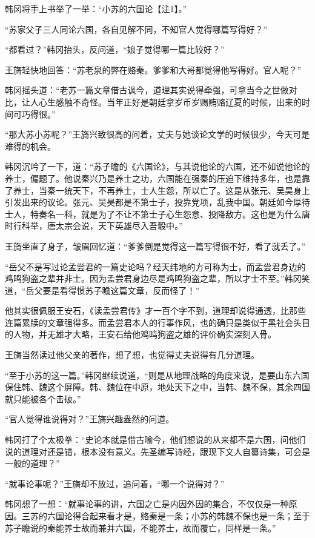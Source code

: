 韩冈将手上书举了一举：“小苏的六国论【注1】。”

“苏家父子三人同论六国，各自见解不同，不知官人觉得哪篇写得好？”

“都看过？”韩冈抬头，反问道，“娘子觉得哪一篇比较好？”

王旖轻快地回答：“苏老泉的弊在赂秦。爹爹和大哥都觉得他写得好。官人呢？”

韩冈摇头道：“老苏一篇文章借古讽今，道理其实说得牵强，可拿当今之世做对比，让人心生感触不奇怪。当年正好是朝廷拿岁币岁赐贿赂辽夏的时候，出来的时间可巧得很。”

“那大苏小苏呢？”王旖兴致很高的问着，丈夫与她谈论文学的时候很少，今天可是难得的机会。

韩冈沉吟了一下，道：“苏子瞻的《六国论》，与其说他论的六国，还不如说他论的养士，偏题了。他说秦兴乃是养士之功，六国能在强秦的压迫下维持多年，也是靠了养士，当秦一统天下，不再养士，士人生怨，所以亡了。这是从张元、吴昊身上引发出来的议论。张元、吴昊都是不第士子，投靠党项，乱我中国。朝廷如今厚待士人，特奏名一科，就是为了不让不第士子心生怨意、投降敌方。这也是为什么唐时行科举，唐太宗会说，天下英雄尽入吾彀中。”

王旖坐直了身子，皱眉回忆道：“爹爹倒是觉得这一篇写得很不好，看了就丢了。”

“岳父不是写过论孟尝君的一篇史论吗？经天纬地的方可称为士，而孟尝君身边的鸡鸣狗盗之辈并非士。因为孟尝君身边尽是鸡鸣狗盗之辈，所以才士不至。”韩冈笑道，“岳父要是看得惯苏子瞻这篇文章，反而怪了！”

他其实很佩服王安石，《读孟尝君传》才一百个字不到，道理却说得通透，比那些连篇累牍的文章强得多。而孟尝君本人的行事作风，也的确只是类似于黑社会头目的人物，并无雄才大略，王安石给他鸡鸣狗盗之雄的评价确实深刻入骨。

王旖当然读过他父亲的著作，想了想，也觉得丈夫说得有几分道理。

“至于小苏的这一篇。”韩冈继续说道，“则是从地理战略的角度来说，是要山东六国保住韩、魏这个屏障。韩、魏位在中原，地处天下之中，当韩、魏不保，其余四国就只能被各个击破。”

“官人觉得谁说得对？”王旖兴趣盎然的问道。

韩冈打了个太极拳：“史论本就是借古喻今，他们想说的从来都不是六国，问他们说的道理对还是错，根本没有意义。先圣编写诗经，跟现下文人自纂诗集，可会是一般的道理？”

“就事论事呢？”王旖却不放过，追问着，“哪一个说得对？”

韩冈想了一想：“就事论事的讲，六国之亡是内因外因的集合，不仅仅是一种原因。三苏的六国论得合起来看才是，赂秦是一条；小苏的韩魏不保也是一条；至于苏子瞻说的秦能养士故而兼并六国，不能养士，故而覆亡，同样是一条。”

